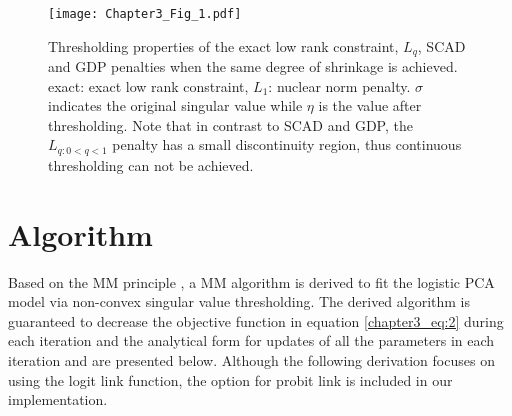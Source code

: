 \begin{figure}[htbp]
    \centering
    \texttt{[image: Chapter3\_Fig\_1.pdf]}
    \caption{Thresholding properties of the exact low rank constraint, $L_{q}$, SCAD and GDP penalties when the same degree of shrinkage is achieved. exact: exact low rank constraint, $L_{1}$: nuclear norm penalty. $\sigma$ indicates the original singular value while $\eta$ is the value after thresholding. Note that in contrast to SCAD and GDP, the $L_{q: 0 < q < 1}$ penalty has a small discontinuity region, thus continuous thresholding can not be achieved.}
    \label{chapter3_fig:1}
\end{figure}

\section{Algorithm}
Based on the MM principle \cite{de1994block,hunter2004tutorial}, a MM algorithm is derived to fit the logistic PCA model via non-convex singular value thresholding. The derived algorithm is guaranteed to decrease the objective function in equation \ref{chapter3_eq:2} during each iteration and the analytical form for updates of all the parameters in each iteration and are presented below. Although the following derivation focuses on using the logit link function, the option for probit link is included in our implementation.

